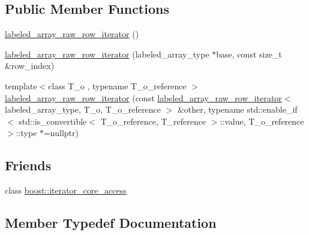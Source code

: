 \subsection*{Public Member Functions}
\begin{DoxyCompactItemize}
\item 
\hyperlink{classIceBRG_1_1labeled__array__raw__row__iterator_ae1038eb4645953cfc365d48414d94698}{labeled\+\_\+array\+\_\+raw\+\_\+row\+\_\+iterator} ()
\item 
\hyperlink{classIceBRG_1_1labeled__array__raw__row__iterator_a0e12ade83e1be91d0cc1234a50f950d6}{labeled\+\_\+array\+\_\+raw\+\_\+row\+\_\+iterator} (labeled\+\_\+array\+\_\+type $\ast$base, const size\+\_\+t \&row\+\_\+index)
\item 
{\footnotesize template$<$class T\+\_\+o , typename T\+\_\+o\+\_\+reference $>$ }\\\hyperlink{classIceBRG_1_1labeled__array__raw__row__iterator_a84cb7571712941200f3855cfa136edde}{labeled\+\_\+array\+\_\+raw\+\_\+row\+\_\+iterator} (const \hyperlink{classIceBRG_1_1labeled__array__raw__row__iterator}{labeled\+\_\+array\+\_\+raw\+\_\+row\+\_\+iterator}$<$ labeled\+\_\+array\+\_\+type, T\+\_\+o, T\+\_\+o\+\_\+reference $>$ \&other, typename std\+::enable\+\_\+if$<$ std\+::is\+\_\+convertible$<$ T\+\_\+o\+\_\+reference, T\+\_\+reference $>$\+::value, T\+\_\+o\+\_\+reference $>$\+::type $\ast$=nullptr)
\end{DoxyCompactItemize}
\subsection*{Friends}
\begin{DoxyCompactItemize}
\item 
class \hyperlink{classIceBRG_1_1labeled__array__raw__row__iterator_ac09f73e325921cc50ebcd96bed0f8096}{boost\+::iterator\+\_\+core\+\_\+access}
\end{DoxyCompactItemize}


\subsection{Member Typedef Documentation}
\hypertarget{classIceBRG_1_1labeled__array__raw__row__iterator_af87be9b30e0d95c012db53c65365c3dd}{}
